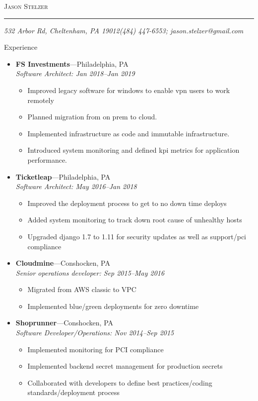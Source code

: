 \documentclass[11pt,oneside]{article}
\makeatletter
\newcommand{\name}{Jason Stelzer}
\newcommand{\addr}{532 Arbor Rd, Cheltenham, PA 19012}
\newcommand{\phone}{(484) 447-6553}
\newcommand{\email}{jason.stelzer@gmail.com}
\newcommand{\bigname}[1]{
        \begin{center}\fontfamily{phv}\selectfont\Huge\scshape#1\end{center}
}
\newenvironment{ressection}[1]{
        \vspace{4pt}
        {\fontfamily{phv}\selectfont\Large#1}
        \begin{itemize}
        \vspace{3pt}
}{
        \end{itemize}
}
\newcommand{\ressubitem}[1]{
        \vspace{-1pt}
        \item \begin{flushleft} #1 \end{flushleft}
}
\newcommand{\resbigitem}[3]{
        \vspace{-5pt}
        \item
        \textbf{#1}---#2 \\
        \textit{#3}
}
\newenvironment{ressubsec}[3]{
        \resbigitem{#1}{#2}{#3}
        \vspace{-2pt}
        \begin{itemize}
}{
        \end{itemize}
}
\makeatother
\begin{document}
 \selectfont

\bigname{\name}

\vspace{-8pt} \rule{\textwidth}{1pt}

\vspace{-1pt} {\small\itshape \addr \hfill \phone; \email}

\vspace{8 pt}

\begin{ressection}{Experience}
        \begin{ressubsec}{FS Investments}{Philadelphia, PA}{Software Architect: Jan 2018--Jan 2019}
          \ressubitem{Improved legacy software for windows to enable vpn users to work remotely }
          \ressubitem{Planned migration from on prem to cloud.}
          \ressubitem{Implemented infrastructure as code and immutable infrastructure. }
          \ressubitem{Introduced system monitoring and defined kpi metrics for application performance. }          
        \end{ressubsec}
  
        \begin{ressubsec}{Ticketleap}{Philadelphia, PA}{Software Architect: May 2016--Jan 2018}
          \ressubitem{Improved the deployment process to get to no down time deploys }
          \ressubitem{Added system monitoring to track down root cause of unhealthy hosts}
          \ressubitem{Upgraded django 1.7 to 1.11 for security updates as well as support/pci compliance }
        \end{ressubsec}
  
        \begin{ressubsec}{Cloudmine}{Conshocken, PA}{Senior operations developer: Sep 2015--May 2016}

          \ressubitem{Migrated from AWS classic to VPC }
          \ressubitem{Implemented blue/green deployments for zero downtime }
        \end{ressubsec}
        
        \begin{ressubsec}{Shoprunner}{Conshocken, PA}{Software Developer/Operations: Nov 2014--Sep 2015}

          \ressubitem{Implemented monitoring for PCI compliance }
          \ressubitem{Implemented backend secret management for production secrets }
          \ressubitem{Collaborated with developers to define best practices/coding standards/deployment process}


\end{ressubsec}
\end{ressection}
\end{document}
